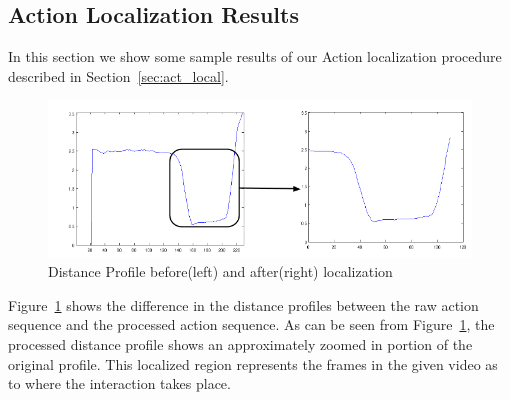 \documentclass[10pt,twocolumn,letterpaper]{article}
\begin{document}




\subsection{Action Localization Results}
In this section we show some sample results of our Action localization procedure described in Section~\ref{sec:act_local}. 
\begin{figure}[ht]

\includegraphics[scale=0.3]{act_local.png}
\caption{Distance Profile before(left) and after(right) localization}
\label{Fig:act_loc}

\end{figure}
Figure~\ref{Fig:act_loc} shows the difference in the distance profiles between the raw action sequence and the processed action sequence. As can be seen from Figure~\ref{Fig:act_loc}, the processed distance profile shows an approximately zoomed in portion of the original profile. This localized region represents the frames in the given video as to where the interaction takes place. 
\end{document}
